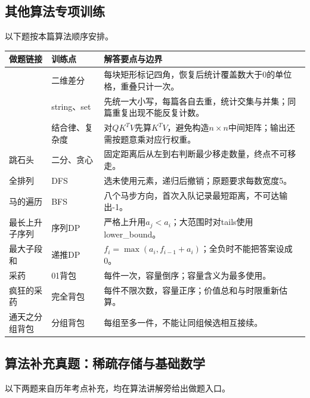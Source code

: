 \subsection{其他算法专项训练}
以下题按本篇算法顺序安排。
\begin{longtable}{P{4.8cm}P{3.2cm}P{6cm}}
\toprule 做题链接 & 训练点 & 解答要点与边界\\\midrule\endhead
{} & 二维差分 & 每块矩形标记四角，恢复后统计覆盖数大于0的单位格，重叠只计一次。\\
 & string、set & 先统一大小写，每篇各自去重，统计交集与并集；同篇重复出现不能反复计数。\\
 & 结合律、复杂度 & 对$QK^TV$先算$K^TV$，避免构造$n\times n$中间矩阵；输出还需按题意乘对应行权重。\\
 跳石头 & 二分、贪心 & 固定距离后从左到右判断最少移走数量，终点不可移走。\\
 全排列 & DFS & 选未使用元素，递归后撤销；原题要求每数宽度5。\\
 马的遍历 & BFS & 八个马步方向，首次入队记录最短距离，不可达输出-1。\\
 最长上升子序列 & 序列DP & 严格上升用$a_j<a_i$；大范围时对tails使用lower\_bound。\\
 最大子段和 & 递推DP & $f_i=\max(a_i,f_{i-1}+a_i)$；全负时不能把答案设成0。\\
 采药 & 01背包 & 每件一次，容量倒序；容量含义为最多使用。\\
 疯狂的采药 & 完全背包 & 每件不限次数，容量正序；价值总和与时限重新估算。\\
 通天之分组背包 & 分组背包 & 每组至多一件，不能让同组候选相互接续。\\
\bottomrule\end{longtable}

\subsection{算法补充真题：稀疏存储与基础数学}
以下两题来自历年考点补充，均在算法讲解旁给出做题入口。
